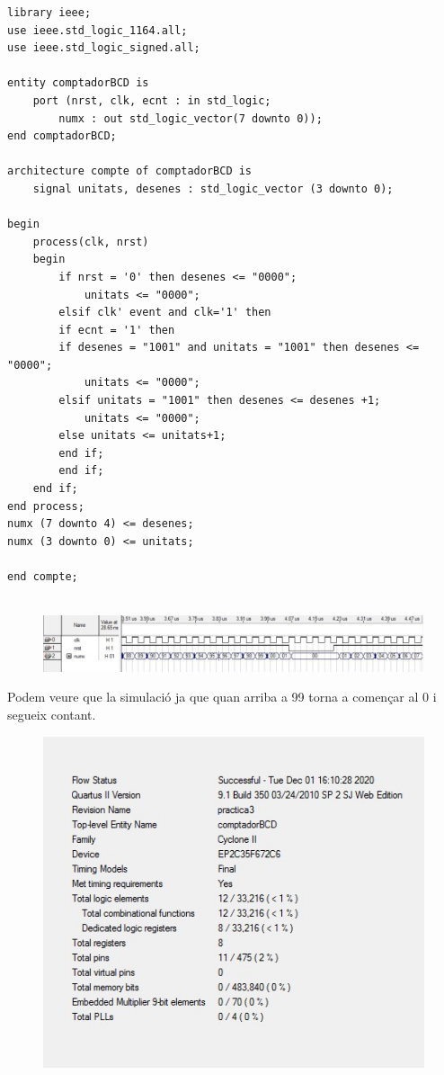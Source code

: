 \documentclass[12pt, a4papre]{article}
\begin{document}
		\begin{lstlisting}[style=vhdl, frame=single, basicstyle=\tiny]
		library ieee;
use ieee.std_logic_1164.all;
use ieee.std_logic_signed.all;

entity comptadorBCD is
	port (nrst, clk, ecnt : in std_logic;
		numx : out std_logic_vector(7 downto 0));
end comptadorBCD;

architecture compte of comptadorBCD is 
	signal unitats, desenes : std_logic_vector (3 downto 0);
	
begin 
	process(clk, nrst)
	begin
	    if nrst = '0' then desenes <= "0000";
			unitats <= "0000";
	    elsif clk' event and clk='1' then
		if ecnt = '1' then
		if desenes = "1001" and unitats = "1001" then desenes <= "0000";
			unitats <= "0000";
		elsif unitats = "1001" then desenes <= desenes +1;
			unitats <= "0000";
		else unitats <= unitats+1;
		end if;
	    end if;
	end if;
end process;
numx (7 downto 4) <= desenes;
numx (3 downto 0) <= unitats;

end compte;
		
		\end{lstlisting}
		
				
\begin{figure}[H]
		\begin{center}
		\includegraphics[width=130mm]{simulacioComptador.jpeg}
		\end{center}
	\end{figure}
	
	Podem veure que la simulació ja que quan arriba a 99 torna a començar al 0 i segueix contant.
	
	\begin{figure}[H]
		\begin{center}
		\includegraphics[width=130mm]{informeComptador.jpeg}
		\end{center}
	\end{figure}
	
\end{document}
